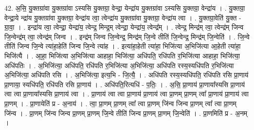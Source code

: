\documentclass[17pt]{extarticle}
\begin{document}
42. अ॒सि॒ यु॒क्तग्रा॑वा यु॒क्तग्रा॑वा ऽस्यसि यु॒क्तग्रा॒ वेन्द्रा॒ येन्द्रा॑य यु॒क्तग्रा॑वा ऽस्यसि यु॒क्तग्रा॒ वेन्द्रा॑य । . यु॒क्तग्रा॒ वेन्द्रा॒ये न्द्रा॑य यु॒क्तग्रा॑वा यु॒क्तग्रा॒ वेन्द्रा॑य त्वा॒ त्वेन्द्रा॑य यु॒क्तग्रा॑वा यु॒क्तग्रा॒ वेन्द्रा॑य त्वा । . यु॒क्तग्रा॒वेति॑ यु॒क्त - ग्रा॒वा॒ । . इन्द्रा॑य त्वा॒ त्वेन्द्रा॒ येन्द्रा॑य॒ त्वेन्द्र॒ मिन्द्र॒म् त्वेन्द्रा॒ येन्द्रा॑य॒ त्वेन्द्र᳚म् । . त्वेन्द्र॒ मिन्द्र॑म् त्वा॒ त्वेन्द्र॑म् जिन्व जि॒न्वेन्द्र॑म् त्वा॒ त्वेन्द्र॑म् जिन्व । . इन्द्र॑म् जिन्व जि॒न्वेन्द्र॒ मिन्द्र॑म् जि॒न्वे तीति॑ जि॒न्वेन्द्र॒ मिन्द्र॑म् जि॒न्वेति॑ । . जि॒न्वे तीति॑ जिन्व जि॒न्वे त्या॑हा॒हेति॑ जिन्व जि॒न्वे त्या॑ह । . इत्या॑हा॒हेती त्या॑हा॒ भिजि॑त्या अ॒भिजि॑त्या आ॒हेती त्या॑हा॒ भिजि॑त्यै । . आ॒हा॒ भिजि॑त्या अ॒भिजि॑त्या आहाहा॒ भिजि॑त्या॒ अधि॑पति॒ रधि॑पति र॒भिजि॑त्या आहाहा॒ भिजि॑त्या॒ अधि॑पतिः । . अ॒भिजि॑त्या॒ अधि॑पति॒ रधि॑पति र॒भिजि॑त्या अ॒भिजि॑त्या॒ अधि॑पति रस्य॒स्यधि॑पति र॒भिजि॑त्या अ॒भिजि॑त्या॒ अधि॑पति रसि । . अ॒भिजि॑त्या॒ इत्य॒भि - जि॒त्यै॒ । . अधि॑पति रस्य॒स्यधि॑पति॒ रधि॑पति रसि प्रा॒णाय॑ प्रा॒णाया॒ स्यधि॑पति॒ रधि॑पति रसि प्रा॒णाय॑ । . अधि॑पति॒रित्यधि॑ - प॒तिः॒ । . अ॒सि॒ प्रा॒णाय॑ प्रा॒णाया᳚स्यसि प्रा॒णाय॑ त्वा त्वा प्रा॒णाया᳚स्यसि प्रा॒णाय॑ त्वा । . प्रा॒णाय॑ त्वा त्वा प्रा॒णाय॑ प्रा॒णाय॑ त्वा प्रा॒णम् प्रा॒णम् त्वा᳚ प्रा॒णाय॑ प्रा॒णाय॑ त्वा प्रा॒णम् । . प्रा॒णायेति॑ प्र - अ॒नाय॑ । . त्वा॒ प्रा॒णम् प्रा॒णम् त्वा᳚ त्वा प्रा॒णम् जि॑न्व जिन्व प्रा॒णम् त्वा᳚ त्वा प्रा॒णम् जि॑न्व । . प्रा॒णम् जि॑न्व जिन्व प्रा॒णम् प्रा॒णम् जि॒न्वे तीति॑ जिन्व प्रा॒णम् प्रा॒णम् जि॒न्वेति॑ । . प्रा॒णमिति॑ प्र - अ॒नम् । \newline
\pagebreak
{}
\end{document}
